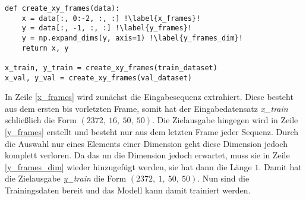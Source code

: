 \begin{minipage}{\textwidth}
\begin{code}
\begin{verbatim}
def create_xy_frames(data):
    x = data[:, 0:-2, :, :] !\label{x_frames}!
    y = data[:, -1, :, :] !\label{y_frames}!
    y = np.expand_dims(y, axis=1) !\label{y_frames_dim}!
    return x, y

x_train, y_train = create_xy_frames(train_dataset)
x_val, y_val = create_xy_frames(val_dataset)
\end{verbatim}
\label{lst:CreateXYFrames}
\end{code}
\end{minipage}

In Zeile \ref{x_frames} wird zunächst die Eingabesequenz extrahiert.
Diese besteht aus dem ersten bis vorletzten Frame, somit hat der Eingabedatensatz \emph{x\_train} schließlich die Form $(2372,~16,~50,~50)$.
Die Zielausgabe hingegen wird in Zeile \ref{y_frames} erstellt und besteht nur aus dem letzten Frame jeder Sequenz.
Durch die Auswahl nur eines Elements einer Dimension geht diese Dimension jedoch komplett verloren.
Da das \acrshort{nn} die Dimension jedoch erwartet, muss sie in Zeile \ref{y_frames_dim} wieder hinzugefügt werden, sie hat dann die Länge $1$.
Damit hat die Zielausgabe \emph{y\_train} die Form $(2372,~1,~50,~50)$.
Nun sind die Trainingsdaten bereit und das Modell kann damit trainiert werden.
